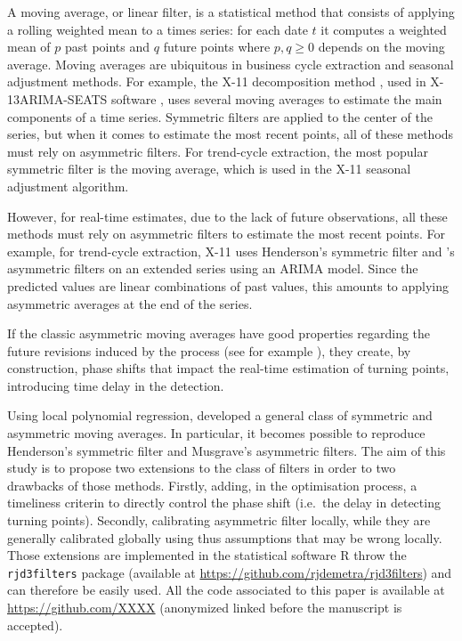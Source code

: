 \documentclass[
]{article}
\newcommand\1{\mathds{1}}
\begin{document}
A moving average, or linear filter, is a statistical method that
consists of applying a rolling weighted mean to a times series: for each
date \(t\) it computes a weighted mean of \(p\) past points and \(q\)
future points where \(p,q\geq0\) depends on the moving average. Moving
averages are ubiquitous in business cycle extraction and seasonal
adjustment methods. For example, the X-11 decomposition method
\autocite{x11}, used in X-13ARIMA-SEATS software \autocite{x13}, uses
several moving averages to estimate the main components of a time
series. Symmetric filters are applied to the center of the series, but
when it comes to estimate the most recent points, all of these methods
must rely on asymmetric filters. For trend-cycle extraction, the most
popular symmetric filter is the \textcite{henderson1916note} moving
average, which is used in the X-11 seasonal adjustment algorithm.

However, for real-time estimates, due to the lack of future
observations, all these methods must rely on asymmetric filters to
estimate the most recent points. For example, for trend-cycle
extraction, X-11 uses Henderson's symmetric filter and
\textcite{musgrave1964set}'s asymmetric filters on an extended series
using an ARIMA model. Since the predicted values are linear combinations
of past values, this amounts to applying asymmetric averages at the end
of the series.

If the classic asymmetric moving averages have good properties regarding
the future revisions induced by the process (see for example
\textcite{pierce1980SA}), they create, by construction, phase shifts
that impact the real-time estimation of turning points, introducing time
delay in the detection.

Using local polynomial regression, \textcite{proietti2008} developed a
general class of symmetric and asymmetric moving averages. In
particular, it becomes possible to reproduce Henderson's symmetric
filter and Musgrave's asymmetric filters. The aim of this study is to
propose two extensions to the \textcite{proietti2008} class of filters
in order to two drawbacks of those methods. Firstly, adding, in the
optimisation process, a timeliness criterin to directly control the
phase shift (i.e.~the delay in detecting turning points). Secondly,
calibrating asymmetric filter locally, while they are generally
calibrated globally using thus assumptions that may be wrong locally.
Those extensions are implemented in the statistical software R
\autocite{logicielr} throw the \texttt{rjd3filters} package (available
at \url{https://github.com/rjdemetra/rjd3filters}) and can therefore be
easily used. All the code associated to this paper is available at
\url{https://github.com/XXXX} (anonymized linked before the manuscript
is accepted).
\end{document}
